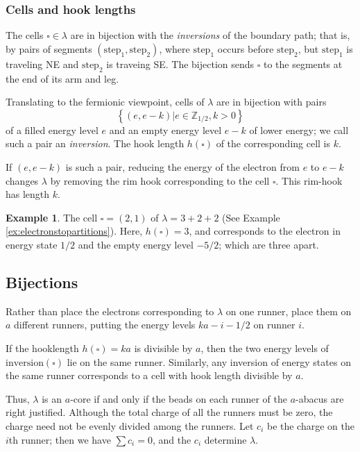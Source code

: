 \documentclass{amsart}[12pt]
\theoremstyle{definition}
\newtheorem{example}[dummy]{Example}
\newcommand{\Z}{\mathbb{Z}}
\begin{document}
\subsubsection{Cells and hook lengths}

The cells $\square\in\lambda$ are in bijection with the
\emph{inversions} of the boundary path; that is, by pairs of segments
$(\text{step}_1, \text{step}_2)$, where $\text{step}_1$ occurs before $\text{step}_2$,
but $\text{step}_1$ is traveling NE and $\text{step}_2$ is traveing SE.  The bijection
sends $\square$ to the segments at the end of its arm and leg.

Translating to the fermionic viewpoint, cells of $\lambda$ are in
bijection with pairs 
$$\left\{(e, e-k)\big | e\in\Z_{1/2}, k>0\right\}$$ of a filled energy level $e$ and an
empty energy level $e-k$ of lower energy; we call such a pair an \emph{inversion}.  The hook length
$h(\square)$ of the corresponding cell is $k$.

If $(e,e-k)$ is such a pair, reducing the energy of the electron from
$e$ to $e-k$ changes $\lambda$ by removing the
rim hook corresponding to the cell $\square$.  This rim-hook has
length $k$.



\begin{example}
The cell $\square=(2,1)$ of $\lambda=3+2+2$ (See Example \ref{ex:electronstopartitions}).
Here, $h(\square)=3$, and corresponds to the electron in energy state $1/2$
and the empty energy level $-5/2$; which are three apart.

\end{example}

\subsection{Bijections}

Rather than place the electrons corresponding to $\lambda$ on one
runner, place them on $a$ different runners, putting the energy
levels $ka-i-1/2$ on runner $i$.

If the hooklength $h(\square)=ka$ is divisible by $a$, then the two
energy levels of $\textrm{inversion}(\square)$ lie on the same
runner.  Similarly, any inversion of energy states on the same
runner corresponds to a cell with hook length divisible by $a$.

Thus, $\lambda$ is an $a$-core if and only if the beads on each runner of the $a$-abacus are right justified.  Although the total charge of all the runners must be zero, the charge need not be evenly divided among the runners.  Let
$c_i$ be the charge on the $i$th runner; then we have $\sum c_i=0$, and the $c_i$ determine $\lambda$.
\end{document}
